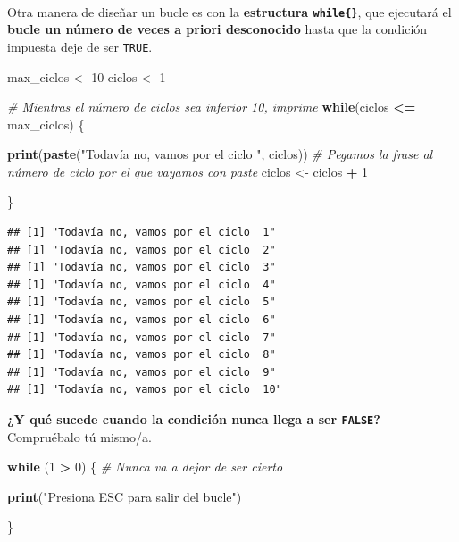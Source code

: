 \documentclass[11pt,]{book}
\newenvironment{Shaded}{\begin{snugshade}}{\end{snugshade}}
\newcommand{\CommentTok}[1]{\textcolor[rgb]{0.37,0.37,0.37}{\textit{#1}}}
\newcommand{\ControlFlowTok}[1]{\textcolor[rgb]{0.27,0.27,0.27}{\textbf{#1}}}
\newcommand{\DecValTok}[1]{\textcolor[rgb]{0.06,0.06,0.06}{#1}}
\newcommand{\KeywordTok}[1]{\textcolor[rgb]{0.27,0.27,0.27}{\textbf{#1}}}
\newcommand{\NormalTok}[1]{#1}
\newcommand{\OperatorTok}[1]{\textcolor[rgb]{0.43,0.43,0.43}{\textbf{#1}}}
\newcommand{\StringTok}[1]{\textcolor[rgb]{0.5,0.5,0.5}{#1}}
\begin{document}
~

Otra manera de diseñar un bucle es con la \textbf{estructura \texttt{while\{\}}}, que ejecutará el \textbf{bucle un número de veces a priori desconocido} hasta que la condición impuesta deje de ser \texttt{TRUE}.

\begin{Shaded}
\begin{Highlighting}[]
\NormalTok{max_ciclos <-}\StringTok{ }\DecValTok{10}
\NormalTok{ciclos <-}\StringTok{ }\DecValTok{1}

\CommentTok{# Mientras el número de ciclos sea inferior 10, imprime}
\ControlFlowTok{while}\NormalTok{(ciclos }\OperatorTok{<=}\StringTok{ }\NormalTok{max_ciclos) \{}
  
  \KeywordTok{print}\NormalTok{(}\KeywordTok{paste}\NormalTok{(}\StringTok{"Todavía no, vamos por el ciclo "}\NormalTok{, ciclos)) }\CommentTok{# Pegamos la frase al número de ciclo por el que vayamos con paste}
\NormalTok{  ciclos <-}\StringTok{ }\NormalTok{ciclos }\OperatorTok{+}\StringTok{ }\DecValTok{1}
  
\NormalTok{\}}
\end{Highlighting}
\end{Shaded}

\begin{verbatim}
## [1] "Todavía no, vamos por el ciclo  1"
## [1] "Todavía no, vamos por el ciclo  2"
## [1] "Todavía no, vamos por el ciclo  3"
## [1] "Todavía no, vamos por el ciclo  4"
## [1] "Todavía no, vamos por el ciclo  5"
## [1] "Todavía no, vamos por el ciclo  6"
## [1] "Todavía no, vamos por el ciclo  7"
## [1] "Todavía no, vamos por el ciclo  8"
## [1] "Todavía no, vamos por el ciclo  9"
## [1] "Todavía no, vamos por el ciclo  10"
\end{verbatim}

\textbf{¿Y qué sucede cuando la condición nunca llega a ser \texttt{FALSE}?} Compruébalo tú mismo/a.

\begin{Shaded}
\begin{Highlighting}[]
\ControlFlowTok{while}\NormalTok{ (}\DecValTok{1} \OperatorTok{>}\StringTok{ }\DecValTok{0}\NormalTok{) \{ }\CommentTok{# Nunca va a dejar de ser cierto}
  
  \KeywordTok{print}\NormalTok{(}\StringTok{"Presiona ESC para salir del bucle"}\NormalTok{)}
  
\NormalTok{\}}
\end{Highlighting}
\end{Shaded}
\end{document}
